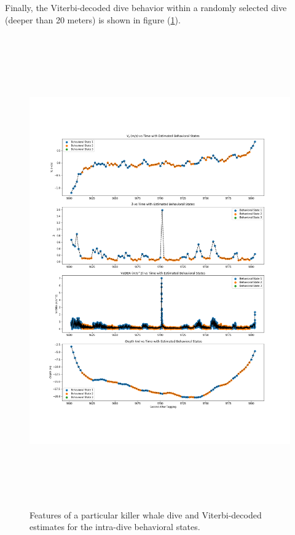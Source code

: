 Finally, the Viterbi-decoded dive behavior within a randomly selected dive (deeper than 20 meters) is shown in figure (\ref{fig:viterbi}).

\newpage

\begin{figure}[h!]
	\centering
	\includegraphics[height=8in]{../Plots/viterbi.png}
	\caption{Features of a particular killer whale dive and Viterbi-decoded estimates for the intra-dive behavioral states.}
	\label{fig:viterbi}
\end{figure}

\newpage

